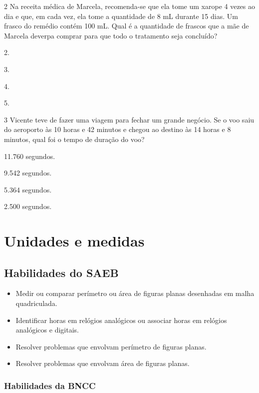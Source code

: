 \pagebreak
\num{2} Na receita médica de Marcela, recomenda-se que ela tome um xarope 4 vezes ao
dia e que, em cada vez, ela tome a quantidade de 8 mL durante 15 dias. Um
frasco do remédio contém 100 mL. Qual é a quantidade de
frascos que a mãe de Marcela deverpa comprar para que todo o tratamento
seja concluído?

\begin{escolha}
\item
  2.
\item
  3.
\item
  4.
\item
  5.
\end{escolha}


\num{3} Vicente teve de fazer uma viagem para fechar um grande negócio. Se o voo
saiu do aeroporto às 10 horas e 42 minutos e chegou ao destino às 14
horas e 8 minutos, qual foi o tempo de duração do voo?

\begin{escolha}
\item
  11.760 segundos.
\item
  9.542 segundos.
\item
  5.364 segundos.
\item
  2.500 segundos.
\end{escolha}


\chapter{Unidades e medidas}

\section{Habilidades do SAEB}

\begin{itemize}
\item Medir ou comparar perímetro ou área de figuras planas desenhadas em
malha quadriculada.
\item Identificar horas em relógios analógicos ou associar horas em relógios
analógicos e digitais.
\item Resolver problemas que envolvam perímetro de figuras planas.
\item Resolver problemas que envolvam área de figuras planas.
\end{itemize}

\subsection{Habilidades da BNCC}

